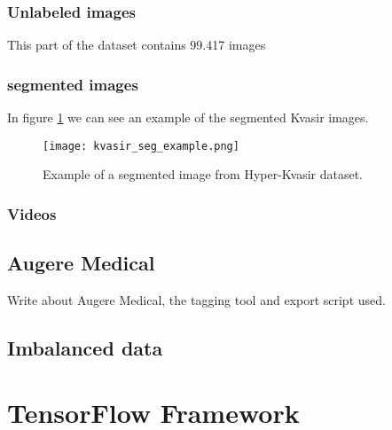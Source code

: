 \documentclass[thesis.tex]{subfiles}
\begin{document}

\subsubsection{Unlabeled images}
This part of the dataset contains 99.417 images

\subsubsection{segmented images}
In figure \ref{fig:kvasir_seg_example} we can see an example of the segmented Kvasir images.

\begin{figure}[H] %
  \begin{center}
    \texttt{[image: kvasir\_seg\_example.png]}
    \caption{Example of a segmented image from Hyper-Kvasir dataset.}
    \label{fig:kvasir_seg_example}
  \end{center}
\end{figure}


\subsubsection{Videos}



\subsection{Augere Medical} \label{sec:augere_medical}
Write about Augere Medical, the tagging tool and export script used.


\subsection{Imbalanced data}




\section{TensorFlow Framework} 
\end{document}
